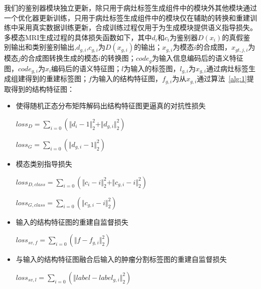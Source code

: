 \documentclass[letterpaper]{article} %
\begin{document}
我们的鉴别器模块独立更新，除只用于病灶标签生成组件中的模块外其他模块通过一个优化器更新训练，只用于病灶标签生成组件中的模块仅在辅助的转换和重建训练中采用真实数据训练更新，合成训练过程仅用于为生成模块提供语义指导损失。多模态MRI生成过程的具体损失函数如下，其中$d_{i}$和$c_{i}$为鉴别器$D(x_i)$的真假鉴别输出和类别鉴别输出,$d_{g,i}$,$c_{g,i}$为$D(x_{g,i})$的输出；$x_{g,i}$为模态$i$的合成图，$x_{gt,j,i}$为模态$j$的合成图转换生成的模态$i$的转换图；$code_g$为输入信息编码后的语义特征图，$code_{g,i}$为$x_i$编码后的语义特征图；$l$为输入的标签图，$l_{g,i}$为$x_{g,i}$通过病灶标签生成组建得到的重建标签图；$f$为输入的结构特征图，$f_{g,i}$为从$x_{g,i}$通过算法~\ref{alg:1}提取得到的结构特征图：

\begin{itemize}
	\item 使得随机正态分布矩阵解码出结构特征图更逼真的对抗性损失

\begin{center}
	$loss_{D}=\sum\limits_{i=0}(\Vert{d_{i}-1}\Vert_{2}^{2}+\Vert{d_{g,i}}\Vert_{2}^{2})$
\end{center}

\begin{center}
	$loss_{G}=\sum\limits_{i=0}(\Vert{d_{g,i}-1}\Vert_{2}^{2})$
\end{center}

	\item 模态类别指导损失

\begin{center}
	$loss_{D,class}=\sum\limits_{i=0}(\Vert{c_{i}-i}\Vert_{2}^{2}+\Vert{c_{g,i}-i}\Vert_{2}^{2})$
\end{center}

\begin{center}
	$loss_{G,class}=\sum\limits_{i=0}(\Vert{c_{g,i}-i}\Vert_{2}^{2})$
\end{center}

	\item 输入的结构特征图的重建自监督损失
	
\begin{center}
	$loss_{sv,f}=\sum\limits_{i=0}(\Vert{f-f_{g,i}}\Vert_{2}^{2})$
\end{center}

	\item 与输入的结构特征图融合后输入的肿瘤分割标签图的重建自监督损失
	
\begin{center}
	$loss_{sv,l}=\sum\limits_{i=0}(\Vert{label-label_{g,i}}\Vert_{2}^{2})$
\end{center}


\end{itemize}
\end{document}
